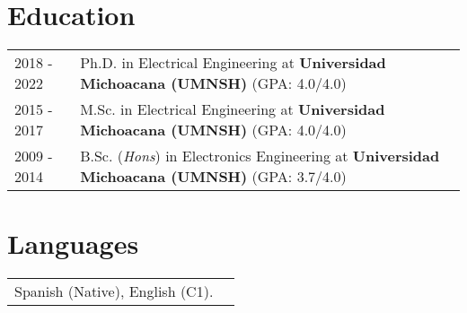 \documentclass[a4paper,10pt]{article}
\begin{document}

\section{Education}
\begin{tabularx}{\linewidth}{@{}l X@{}}	
2018 - 2022 & Ph.D. in Electrical Engineering  at \textbf{Universidad Michoacana (UMNSH)} \hfill \normalsize (GPA: 4.0/4.0) \\

2015 - 2017 & M.Sc. in Electrical Engineering at \textbf{Universidad Michoacana (UMNSH)} \hfill (GPA: 4.0/4.0) \\ 

2009 - 2014 & B.Sc. (\textit{Hons}) in Electronics Engineering at \textbf{Universidad Michoacana (UMNSH)} \hfill (GPA: 3.7/4.0) \\ 
\end{tabularx}

\section{Languages}
\begin{tabularx}{\linewidth}{@{}l X@{}}
Spanish (Native), English (C1).\\  
\end{tabularx}

\end{document}
